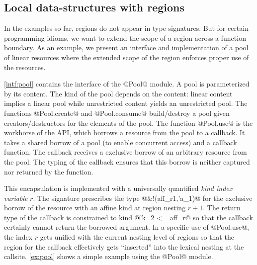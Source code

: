 


\subsection{Local data-structures with regions}
\label{tuto:pool}

In the examples so far, regions do not appear in type signatures.
But for certain programming idioms, we want to extend the scope of a
region across a function boundary. As an example,
we present an interface and implementation of a pool of linear resources where the
extended scope of the region enforces proper use of the resources.

\cref{intf:pool} contains the interface of the @Pool@ module.
A pool is parameterized by its content. The kind of the pool
depends on the content: linear content implies
a linear pool while unrestricted content yields an unrestricted pool.
The functions @Pool.create@ and @Pool.consume@
build/destroy a pool given creators/destructors for the elements
of the pool.
The function @Pool.use@ is the workhorse of the API, which
borrows a resource from the pool to a callback.
It takes a shared borrow of a pool (to enable concurrent access) and a
callback function.
The callback receives a exclusive borrow of an arbitrary resource from the pool.
The typing of the callback ensures
that this borrow is neither captured nor returned by the function.

This encapsulation is implemented with a universally quantified \emph{kind index variable} $r$.
The signature prescribes the type @&!(aff_r1,'a_1)@ for the
exclusive borrow of the resource with an affine kind at region nesting $r+1$. The return
type of the callback is constrained to kind @'k_2 <= aff_r@
so that the callback certainly cannot return the borrowed argument.
In a specific use of @Pool.use@, the index $r$ gets unified
with the current nesting level of regions so that the region for the
callback effectively gets ``inserted'' into the lexical nesting at the callsite.
%
\cref{ex:pool} shows a simple example using the @Pool@ module.

